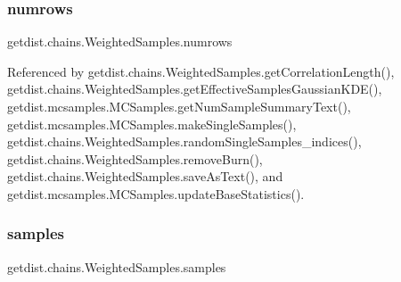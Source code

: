 \mbox{\label{classgetdist_1_1chains_1_1WeightedSamples_ab019d2809b81f29766c1cb53585212c9}} 
\subsubsection{\texorpdfstring{numrows}{numrows}}
{\footnotesize\ttfamily getdist.\+chains.\+Weighted\+Samples.\+numrows}



Referenced by getdist.\+chains.\+Weighted\+Samples.\+get\+Correlation\+Length(), getdist.\+chains.\+Weighted\+Samples.\+get\+Effective\+Samples\+Gaussian\+K\+D\+E(), getdist.\+mcsamples.\+M\+C\+Samples.\+get\+Num\+Sample\+Summary\+Text(), getdist.\+mcsamples.\+M\+C\+Samples.\+make\+Single\+Samples(), getdist.\+chains.\+Weighted\+Samples.\+random\+Single\+Samples\+\_\+indices(), getdist.\+chains.\+Weighted\+Samples.\+remove\+Burn(), getdist.\+chains.\+Weighted\+Samples.\+save\+As\+Text(), and getdist.\+mcsamples.\+M\+C\+Samples.\+update\+Base\+Statistics().

\mbox{\label{classgetdist_1_1chains_1_1WeightedSamples_a4294526e2f75dc40e0cc1f3afd1c09ff}} 
\subsubsection{\texorpdfstring{samples}{samples}}
{\footnotesize\ttfamily getdist.\+chains.\+Weighted\+Samples.\+samples}



